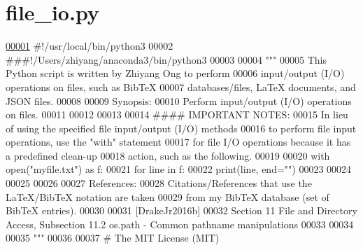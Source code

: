\hypertarget{file__io_8py_source}{}\section{file\+\_\+io.\+py}
\label{file__io_8py_source}

\begin{DoxyCode}
\hypertarget{file__io_8py_source_l00001}{}\hyperlink{namespaceutilities_1_1file__io}{00001} \textcolor{comment}{#!/usr/local/bin/python3}
00002 \textcolor{comment}{###!/Users/zhiyang/anaconda3/bin/python3}
00003 
00004 \textcolor{stringliteral}{"""}
00005 \textcolor{stringliteral}{    This Python script is written by Zhiyang Ong to perform}
00006 \textcolor{stringliteral}{        input/output (I/O) operations on files, such as BibTeX}
00007 \textcolor{stringliteral}{        databases/files, LaTeX documents, and JSON files.}
00008 \textcolor{stringliteral}{}
00009 \textcolor{stringliteral}{    Synopsis:}
00010 \textcolor{stringliteral}{    Perform input/output (I/O) operations on files.}
00011 \textcolor{stringliteral}{}
00012 \textcolor{stringliteral}{}
00013 \textcolor{stringliteral}{}
00014 \textcolor{stringliteral}{    #### IMPORTANT NOTES:}
00015 \textcolor{stringliteral}{    In lieu of using the specified file input/output (I/O) methods}
00016 \textcolor{stringliteral}{        to perform file input operations, use the "with" statement}
00017 \textcolor{stringliteral}{        for file I/O operations because it has a predefined clean-up}
00018 \textcolor{stringliteral}{        action, such as the following.}
00019 \textcolor{stringliteral}{}
00020 \textcolor{stringliteral}{    with open("myfile.txt") as f:}
00021 \textcolor{stringliteral}{        for line in f:}
00022 \textcolor{stringliteral}{            print(line, end="")}
00023 \textcolor{stringliteral}{}
00024 \textcolor{stringliteral}{}
00025 \textcolor{stringliteral}{}
00026 \textcolor{stringliteral}{}
00027 \textcolor{stringliteral}{    References:}
00028 \textcolor{stringliteral}{    Citations/References that use the LaTeX/BibTeX notation are taken}
00029 \textcolor{stringliteral}{        from my BibTeX database (set of BibTeX entries).}
00030 \textcolor{stringliteral}{}
00031 \textcolor{stringliteral}{    [DrakeJr2016b]}
00032 \textcolor{stringliteral}{        Section 11 File and Directory Access, Subsection 11.2 os.path - Common pathname manipulations}
00033 \textcolor{stringliteral}{}
00034 \textcolor{stringliteral}{}
00035 \textcolor{stringliteral}{"""}
00036 
00037 \textcolor{comment}{#   The MIT License (MIT)}

\end{DoxyCode}
